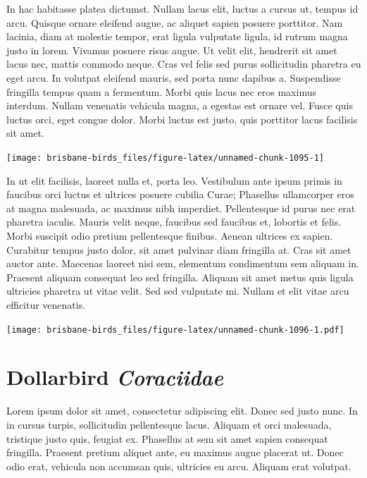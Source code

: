 \documentclass[]{book}
\let\origfigure\figure
\let\endorigfigure\endfigure
\renewenvironment{figure}[1][2] {
  \expandafter\origfigure\expandafter[H]
} {
  \endorigfigure
}
\begin{document}
In hac habitasse platea dictumst. Nullam lacus elit, luctus a cursus ut,
tempus id arcu. Quisque ornare eleifend augue, ac aliquet sapien posuere
porttitor. Nam lacinia, diam at molestie tempor, erat ligula vulputate
ligula, id rutrum magna justo in lorem. Vivamus posuere risus augue. Ut
velit elit, hendrerit sit amet lacus nec, mattis commodo neque. Cras vel
felis sed purus sollicitudin pharetra eu eget arcu. In volutpat eleifend
mauris, sed porta nunc dapibus a. Suspendisse fringilla tempus quam a
fermentum. Morbi quis lacus nec eros maximus interdum. Nullam venenatis
vehicula magna, a egestas est ornare vel. Fusce quis luctus orci, eget
congue dolor. Morbi luctus est justo, quis porttitor lacus facilisis sit
amet.

\begin{figure}
\texttt{[image: brisbane-birds\_files/figure-latex/unnamed-chunk-1095-1]} \caption{insert figure caption}\label{fig:unnamed-chunk-1095}
\end{figure}

In ut elit facilisis, laoreet nulla et, porta leo. Vestibulum ante ipsum
primis in faucibus orci luctus et ultrices posuere cubilia Curae;
Phasellus ullamcorper eros at magna malesuada, ac maximus nibh
imperdiet. Pellentesque id purus nec erat pharetra iaculis. Mauris velit
neque, faucibus sed faucibus et, lobortis et felis. Morbi suscipit odio
pretium pellentesque finibus. Aenean ultrices ex sapien. Curabitur
tempus justo dolor, sit amet pulvinar diam fringilla at. Cras sit amet
auctor ante. Maecenas laoreet nisi sem, elementum condimentum sem
aliquam in. Praesent aliquam consequat leo sed fringilla. Aliquam sit
amet metus quis ligula ultricies pharetra ut vitae velit. Sed sed
vulputate mi. Nullam et elit vitae arcu efficitur venenatis.

\begin{figure}
\centering
\texttt{[image: brisbane-birds\_files/figure-latex/unnamed-chunk-1096-1.pdf]}
\caption{\label{fig:unnamed-chunk-1096}insert figure caption}
\end{figure}

\chapter{\texorpdfstring{Dollarbird
\emph{Coraciidae}}{Dollarbird Coraciidae}}\label{dollarbird-coraciidae}

Lorem ipsum dolor sit amet, consectetur adipiscing elit. Donec sed justo
nunc. In in cursus turpis, sollicitudin pellentesque lacus. Aliquam et
orci malesuada, tristique justo quis, feugiat ex. Phasellus at sem sit
amet sapien consequat fringilla. Praesent pretium aliquet ante, eu
maximus augue placerat ut. Donec odio erat, vehicula non accumsan quis,
ultricies eu arcu. Aliquam erat volutpat.
\end{document}

